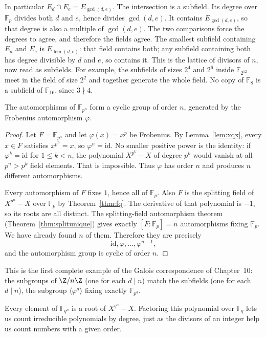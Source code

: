 In particular $E_d\cap E_e=E_{\gcd(d,e)}$. The intersection is
a subfield. Its degree over $\mathbb F_p$ divides both $d$ and $e$, hence divides $\gcd(d,e)$. It contains
$E_{\gcd(d,e)}$, so that degree is also a multiple of $\gcd(d,e)$. The two comparisons force the degrees to agree, and therefore the fields agree. The smallest subfield containing $E_d$
and $E_e$ is $E_{\operatorname{lcm}(d,e)}$: that field contains both;
any subfield containing both has degree divisible by $d$ and $e$,
so contains it. This is the lattice of divisors of $n$, now read as
subfields. For example, the subfields of sizes $2^4$ and $2^6$ inside
$\mathbb F_{2^{12}}$ meet in the field of size $2^2$ and together
generate the whole field. No copy of $\mathbb F_8$ is a subfield of
$\mathbb F_{16}$, since $3\nmid4$.

\begin{theorem}\label{thm:galfq}
The automorphisms of $\mathbb F_{p^n}$ form a cyclic group of order $n$, generated by the Frobenius automorphism $\varphi$.
\end{theorem}
\begin{proof}
Let $F=\mathbb F_{p^n}$ and let $\varphi(x)=x^p$ be Frobenius.
By Lemma~\ref{lem:xqx}, every $x\in F$ satisfies
$x^{p^n}=x$, so $\varphi^n=\mathrm{id}$.
No smaller positive power is the identity:
if $\varphi^k=\mathrm{id}$ for $1\le k<n$,
the polynomial $X^{p^k}-X$ of degree $p^k$
would vanish at all $p^n>p^k$ field elements.
That is impossible. Thus $\varphi$ has order $n$
and produces $n$ different automorphisms.

Every automorphism of $F$ fixes $1$,
hence all of $\mathbb F_p$. Also $F$
is the splitting field of $X^{p^n}-X$
over $\mathbb F_p$ by Theorem~\ref{thm:fq}.
The derivative of that polynomial is $-1$,
so its roots are all distinct.
The splitting-field automorphism theorem
(Theorem~\ref{thm:splitunique}) gives
exactly $[F:\mathbb F_p]=n$ automorphisms
fixing $\mathbb F_p$. We have already found
$n$ of them. Therefore they are precisely
\[
\boxed{\mathrm{id},\varphi,\ldots,\varphi^{n-1}},
\]
and the automorphism group is cyclic of order $n$.
\end{proof}

This is the first complete example of the Galois correspondence of Chapter~10: the subgroups of $\Z/n\Z$ (one for each $d\mid n$) match the subfields (one for each $d\mid n$), the subgroup $\langle\varphi^d\rangle$ fixing exactly $\mathbb F_{p^d}$.

Every element of $\mathbb F_{q^n}$ is a root of $X^{q^n}-X$. Factoring this polynomial over $\mathbb F_q$ lets us count irreducible polynomials by degree, just as the divisors of an integer help us count numbers with a given order.

